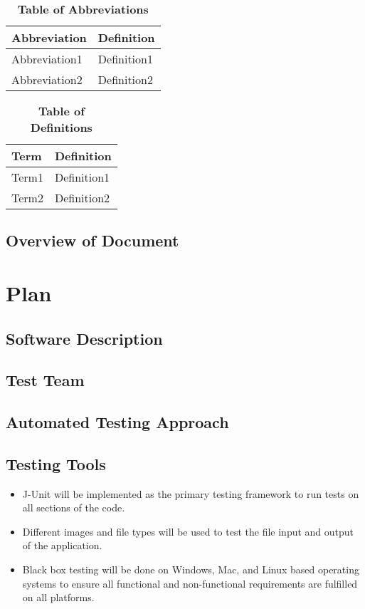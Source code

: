 \documentclass[12pt, titlepage]{article}
\begin{document}
\begin{table}[hbp]
\caption{\textbf{Table of Abbreviations}} \label{Table}

\begin{tabularx}{\textwidth}{p{3cm}X}
\toprule
\textbf{Abbreviation} & \textbf{Definition} \\
\midrule
Abbreviation1 & Definition1\\
Abbreviation2 & Definition2\\
\bottomrule
\end{tabularx}

\end{table}

\begin{table}[!htbp]
\caption{\textbf{Table of Definitions}} \label{Table}

\begin{tabularx}{\textwidth}{p{3cm}X}
\toprule
\textbf{Term} & \textbf{Definition}\\
\midrule
Term1 & Definition1\\
Term2 & Definition2\\
\bottomrule
\end{tabularx}

\end{table}	

\subsection{Overview of Document}

\section{Plan}
	
\subsection{Software Description}

\subsection{Test Team}

\subsection{Automated Testing Approach}

\subsection{Testing Tools}
\begin{itemize}
\item J-Unit will be implemented as the primary testing framework to run tests on all sections of the code.
\item Different images and file types will be used to test the file input and output of the application.
\item Black box testing will be done on Windows, Mac, and Linux based operating systems to ensure all functional and non-functional requirements are fulfilled on all platforms.
\end{itemize}
\end{document}
